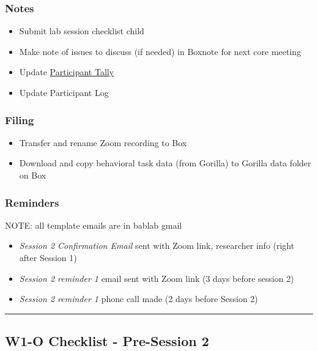 \documentclass[
]{book}
\providecommand{\tightlist}{%
  \setlength{\itemsep}{0pt}\setlength{\parskip}{0pt}}
\begin{document}
\hypertarget{notes-1}{%
\subsubsection{Notes}\label{notes-1}}

\begin{itemize}
\tightlist
\item
  Submit lab session checklist child
\item
  Make note of issues to discuss (if needed) in Boxnote for next core meeting
\item
  Update \href{https://ucla.app.box.com/file/724688028024}{Participant Tally}
\item
  Update Participant Log
\end{itemize}

\hypertarget{filing-2}{%
\subsubsection{Filing}\label{filing-2}}

\begin{itemize}
\tightlist
\item
  Transfer and rename Zoom recording to Box
\item
  Download and copy behavioral task data (from Gorilla) to Gorilla data folder on Box
\end{itemize}

\hypertarget{reminders-1}{%
\subsubsection{Reminders}\label{reminders-1}}

NOTE: all template emails are in bablab gmail

\begin{itemize}
\tightlist
\item
  \emph{Session 2 Confirmation Email} sent with Zoom link, researcher info (right after Session 1)
\item
  \emph{Session 2 reminder 1} email sent with Zoom link (3 days before session 2)
\item
  \emph{Session 2 reminder 1} phone call made (2 days before Session 2)
\end{itemize}

\begin{center}\rule{0.5\linewidth}{0.5pt}\end{center}

\hypertarget{w1-o-checklist---pre-session-2}{%
\subsection{W1-O Checklist - Pre-Session 2}\label{w1-o-checklist---pre-session-2}}
\end{document}
